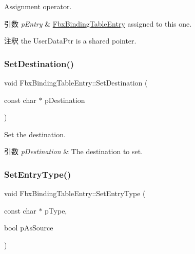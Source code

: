 Assignment operator. 
\begin{DoxyParams}{引数}
{\em p\+Entry} & \hyperlink{class_fbx_binding_table_entry}{Fbx\+Binding\+Table\+Entry} assigned to this one. \\
\hline
\end{DoxyParams}
\begin{DoxyRemark}{注釈}
the User\+Data\+Ptr is a shared pointer. 
\end{DoxyRemark}
\mbox{\label{class_fbx_binding_table_entry_aaa49a62bd197febfb6052f3efa50eaf3}} 
\subsubsection{\texorpdfstring{Set\+Destination()}{SetDestination()}}
{\footnotesize\ttfamily void Fbx\+Binding\+Table\+Entry\+::\+Set\+Destination (\begin{DoxyParamCaption}\item[{const char $\ast$}]{p\+Destination }\end{DoxyParamCaption})}

Set the destination. 
\begin{DoxyParams}{引数}
{\em p\+Destination} & The destination to set. \\
\hline
\end{DoxyParams}
\mbox{\label{class_fbx_binding_table_entry_a9e54bf1bb2bd0bcca05b7b6a057b0b8a}} 
\subsubsection{\texorpdfstring{Set\+Entry\+Type()}{SetEntryType()}}
{\footnotesize\ttfamily void Fbx\+Binding\+Table\+Entry\+::\+Set\+Entry\+Type (\begin{DoxyParamCaption}\item[{const char $\ast$}]{p\+Type,  }\item[{bool}]{p\+As\+Source }\end{DoxyParamCaption})}

